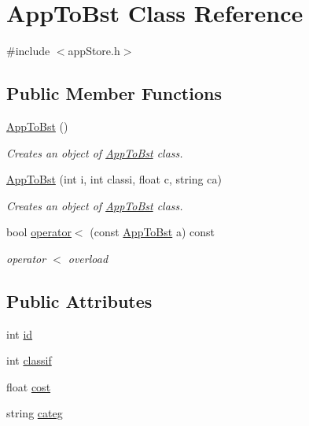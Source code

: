 \hypertarget{class_app_to_bst}{\section{App\-To\-Bst Class Reference}
\label{class_app_to_bst}
}


{\ttfamily \#include $<$app\-Store.\-h$>$}

\subsection*{Public Member Functions}
\begin{DoxyCompactItemize}
\item 
\hyperlink{class_app_to_bst_a7f6079c856670e0ca7df024ac6a71498}{App\-To\-Bst} ()
\begin{DoxyCompactList}\small\item\em Creates an object of \hyperlink{class_app_to_bst}{App\-To\-Bst} class. \end{DoxyCompactList}\item 
\hyperlink{class_app_to_bst_a4f5b56ef82453a2d665422275d96ee5d}{App\-To\-Bst} (int i, int classi, float c, string ca)
\begin{DoxyCompactList}\small\item\em Creates an object of \hyperlink{class_app_to_bst}{App\-To\-Bst} class. \end{DoxyCompactList}\item 
bool \hyperlink{class_app_to_bst_aa32a8bb02c4cef7ecd7877622a0278b2}{operator$<$} (const \hyperlink{class_app_to_bst}{App\-To\-Bst} a) const 
\begin{DoxyCompactList}\small\item\em operator $<$ overload \end{DoxyCompactList}\end{DoxyCompactItemize}
\subsection*{Public Attributes}
\begin{DoxyCompactItemize}
\item 
int \hyperlink{class_app_to_bst_af25693604a7f39c2848d750f76408587}{id}
\item 
int \hyperlink{class_app_to_bst_aae9b4fdc3556455b039841b11be18841}{classif}
\item 
float \hyperlink{class_app_to_bst_a96aa8eb927a45e1cb3b704e7d6769ed7}{cost}
\item 
string \hyperlink{class_app_to_bst_a1e5b433948581d83d1506d8e22279620}{categ}
\end{DoxyCompactItemize}


